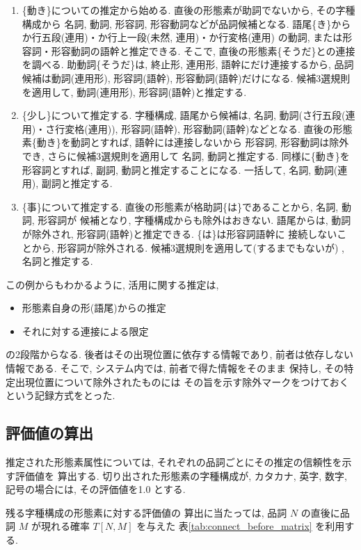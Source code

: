 \begin{enumerate}
\item \{動き\}についての推定から始める.  
直後の形態素が助詞でないから, その字種構成から
名詞, 動詞, 形容詞, 形容動詞などが品詞候補となる.  
語尾\{き\}から
か行五段(連用)・か行上一段(未然, 連用)・か行変格(連用)
の動詞, または形容詞・形容動詞の語幹と推定できる.  
そこで, 直後の形態素\{そうだ\}との連接を調べる.  
助動詞\{そうだ\}は, 終止形, 連用形, 語幹にだけ連接するから, 
品詞候補は動詞(連用形), 形容詞(語幹), 形容動詞(語幹)だけになる.  
候補3選規則を適用して, 動詞(連用形), 形容詞(語幹)と推定する.  
\item \{少し\}について推定する.  
字種構成, 語尾から候補は, 名詞, 動詞(さ行五段(連用)・さ行変格(連用)), 
形容詞(語幹), 形容動詞(語幹)などとなる.  
直後の形態素\{動き\}を動詞とすれば, 語幹には連接しないから
形容詞, 形容動詞は除外でき, さらに候補3選規則を適用して
名詞, 動詞と推定する.  同様に\{動き\}を形容詞とすれば, 
副詞, 動詞と推定することになる.  一括して, 名詞, 動詞(連用), 
副詞と推定する.  
\item \{事\}について推定する.  
直後の形態素が格助詞\{は\}であることから, 名詞, 動詞, 形容詞が
候補となり, 字種構成からも除外はおきない.  語尾からは, 
動詞が除外され, 形容詞(語幹)と推定できる.  
\{は\}は形容詞語幹に
接続しないことから, 形容詞が除外される. 
候補3選規則を適用して(するまでもないが) , 名詞と推定する.  
\end{enumerate}

この例からもわかるように, 活用に関する推定は, 
\begin{itemize}
\item
形態素自身の形(語尾)からの推定
\item
それに対する連接による限定
\end{itemize}
の2段階からなる.  
後者はその出現位置に依存する情報であり, 
前者は依存しない情報である.  
そこで, システム内では, 前者で得た情報をそのまま
保持し, その特定出現位置について除外されたものには
その旨を示す除外マークをつけておくという記録方式をとった.

\subsection{ 評価値の算出 }
推定された形態素属性については, 
それぞれの品詞ごとにその推定の信頼性を示す評価値を
算出する. 
切り出された形態素の字種構成が, 
カタカナ, 英字, 数字, 記号の場合には, 
その評価値を1.0 とする. 

残る字種構成の形態素に対する評価値の
算出に当たっては, 品詞
$N$ の直後に品詞 $M$ が現れる確率 $T[N,M]$ を与えた
表\ref{tab:connect_before_matrix} を利用する. 

